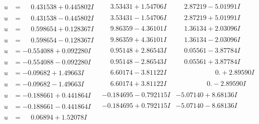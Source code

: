 \documentclass[1p]{elsarticle_modified}
\theoremstyle{definition}
\begin{document}
$$\begin{array}{c|c|c}
\begin{aligned}
u &= \phantom{-}0.431538 + 0.445802 I\end{aligned}
 & \phantom{-}3.53431 + 1.54706 I & \phantom{-}2.87219 - 5.01991 I \\ \hline\begin{aligned}
u &= \phantom{-}0.431538 - 0.445802 I\end{aligned}
 & \phantom{-}3.53431 - 1.54706 I & \phantom{-}2.87219 + 5.01991 I \\ \hline\begin{aligned}
u &= \phantom{-}0.598654 + 0.128367 I\end{aligned}
 & \phantom{-}9.86359 - 4.36101 I & \phantom{-}1.36134 + 2.03096 I \\ \hline\begin{aligned}
u &= \phantom{-}0.598654 - 0.128367 I\end{aligned}
 & \phantom{-}9.86359 + 4.36101 I & \phantom{-}1.36134 - 2.03096 I \\ \hline\begin{aligned}
u &= -0.554088 + 0.092280 I\end{aligned}
 & \phantom{-}0.95148 + 2.86543 I & \phantom{-}0.05561 - 3.87784 I \\ \hline\begin{aligned}
u &= -0.554088 - 0.092280 I\end{aligned}
 & \phantom{-}0.95148 - 2.86543 I & \phantom{-}0.05561 + 3.87784 I \\ \hline\begin{aligned}
u &= -0.09682 + 1.49663 I\end{aligned}
 & \phantom{-}6.60174 - 3.81122 I & \phantom{-0.000000 -}0. + 2.89590 I \\ \hline\begin{aligned}
u &= -0.09682 - 1.49663 I\end{aligned}
 & \phantom{-}6.60174 + 3.81122 I & \phantom{-0.000000 } 0. - 2.89590 I \\ \hline\begin{aligned}
u &= -0.188661 + 0.441864 I\end{aligned}
 & -0.184695 - 0.792115 I & -5.07140 + 8.68136 I \\ \hline\begin{aligned}
u &= -0.188661 - 0.441864 I\end{aligned}
 & -0.184695 + 0.792115 I & -5.07140 - 8.68136 I \\ \hline\begin{aligned}
u &= \phantom{-}0.06894 + 1.52078 I\end{aligned}

\end{array}$$
\end{document}
